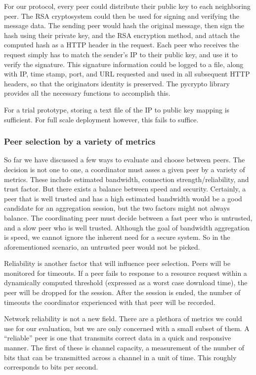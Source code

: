 \documentclass[12pt]{article}
\begin{document}
			For our protocol, every peer could distribute their public key to each neighboring peer. The RSA cryptosystem could then be used for signing and verifying the message data. The sending peer would hash the original message, then sign the hash using their private key, and the RSA encryption method, and attach the computed hash as a HTTP header in the request. Each peer who receives the request simply has to match the sender's IP to their public key, and use it to verify the signature. This signature information could be logged to a file, along with IP, time stamp, port, and URL requested and used in all subsequent HTTP headers, so that the originators identity is preserved. The pycrypto library provides all the necessary functions to accomplish this.

			For a trial prototype, storing a text file of the IP to public key mapping is sufficient. For full scale deployment however, this fails to suffice. 

		\subsubsection{Peer selection by a variety of metrics}

			So far we have discussed a few ways to evaluate and choose between peers. The decision is not one to one, a coordinator must asses a given peer by a variety of metrics. These include estimated bandwidth, connection strength/reliability, and trust factor. But there exists a balance between speed and security. Certainly, a peer that is well trusted and has a high estimated bandwidth would be a good candidate for an aggregation session, but the two factors might not always balance. The coordinating peer must decide between a fast peer who is untrusted, and a slow peer who is well trusted. Although the goal of bandwidth aggregation is speed, we cannot ignore the inherent need for a secure system. So in the aforementioned scenario, an untrusted peer would not be picked.

			Reliability is another factor that will influence peer selection. Peers will be monitored for timeouts. If a peer fails to response to a resource request within a dynamically computed threshold (expressed as a worst case download time), the peer will be dropped for the session. After the session is ended, the number of timeouts the coordinator experienced with that peer will be recorded. 

			Network reliability is not a new field. There are a plethora of metrics we could use for our evaluation, but we are only concerned with a small subset of them. A ``reliable'' peer is one that transmits correct data in a quick and responsive manner. The first of these is channel capacity, a measurement of the number of bits that can be transmitted across a channel in a unit of time. This roughly corresponds to bits per second. 
\end{document}
